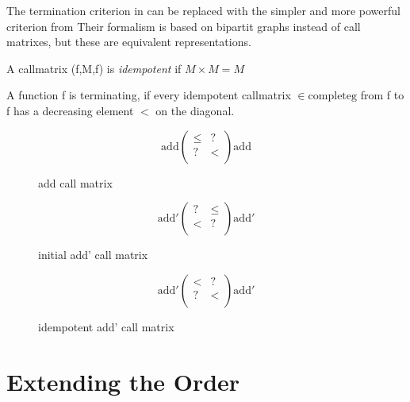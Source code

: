 The termination criterion in \cite{abelAltenkirch:predStRec} can be replaced with the
simpler and more powerful criterion from \cite{lee01sizechang}
Their formalism is based on bipartit graphs instead of call matrixes, but these are
equivalent representations.

\begin{definition}
A callmatrix (f,M,f) is \emph{idempotent} if $ M \times M = M $ 
\end{definition}

\begin{definition}
A function f is terminating, if every idempotent callmatrix  $ \in \mathrm{complete g} $ from f to f has a decreasing element $<$ on
the diagonal.
\end{definition}

\begin{figure}
\[
\mathrm{add}\begin{pmatrix}

\leq & ? \\
?    & < \\

\end{pmatrix}\mathrm{add}
\]
\caption{add call matrix}
\end{figure}

\begin{figure}

\[
\mathrm{add'} \begin{pmatrix}

? & \leq \\
< & ?   \\

\end{pmatrix} \mathrm{add'}
\]

\caption{initial add' call matrix}

\end{figure}


\begin{figure}

\[
\mathrm{add'} \begin{pmatrix}

< & ?    \\
? & <    \\

\end{pmatrix} \mathrm{add'}
\] 
\caption{idempotent add' call matrix}

\end{figure}


\section{Extending the Order}

